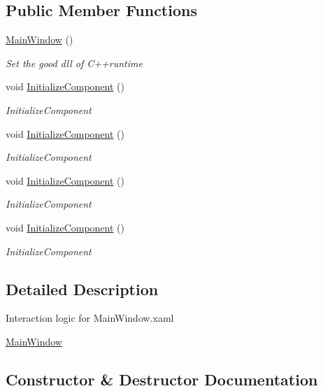\subsection*{Public Member Functions}
\begin{DoxyCompactItemize}
\item 
\hyperlink{class_presentation_1_1_main_window_a9f2c85f07c861da5f287d482913cc7f1}{Main\+Window} ()
\begin{DoxyCompactList}\small\item\em Set the good dll of C++runtime \end{DoxyCompactList}\item 
void \hyperlink{class_presentation_1_1_main_window_ae65bc3f86809be61714a19b6c8b9fba0}{Initialize\+Component} ()
\begin{DoxyCompactList}\small\item\em Initialize\+Component \end{DoxyCompactList}\item 
void \hyperlink{class_presentation_1_1_main_window_ae65bc3f86809be61714a19b6c8b9fba0}{Initialize\+Component} ()
\begin{DoxyCompactList}\small\item\em Initialize\+Component \end{DoxyCompactList}\item 
void \hyperlink{class_presentation_1_1_main_window_ae65bc3f86809be61714a19b6c8b9fba0}{Initialize\+Component} ()
\begin{DoxyCompactList}\small\item\em Initialize\+Component \end{DoxyCompactList}\item 
void \hyperlink{class_presentation_1_1_main_window_ae65bc3f86809be61714a19b6c8b9fba0}{Initialize\+Component} ()
\begin{DoxyCompactList}\small\item\em Initialize\+Component \end{DoxyCompactList}\end{DoxyCompactItemize}


\subsection{Detailed Description}
Interaction logic for Main\+Window.\+xaml 

\hyperlink{class_presentation_1_1_main_window}{Main\+Window} 

\subsection{Constructor \& Destructor Documentation}
\mbox{\label{class_presentation_1_1_main_window_a9f2c85f07c861da5f287d482913cc7f1}} 
